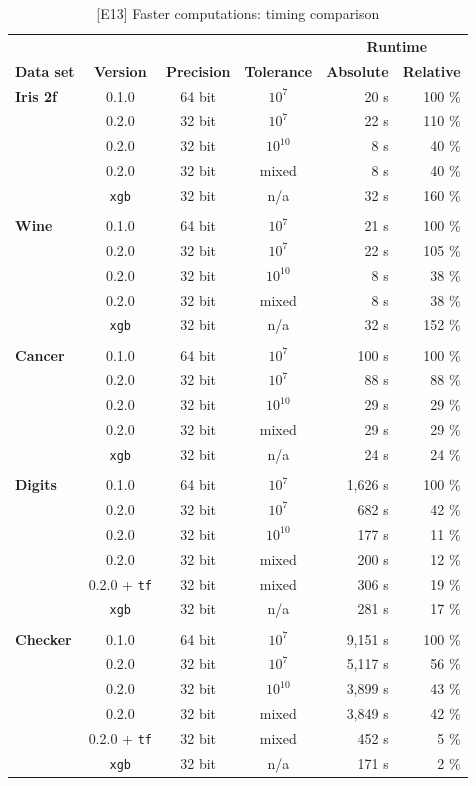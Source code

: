 \begin{table}
\caption{[E13] Faster computations: timing comparison}
\label{tab_faster_timing}
%
\begin{center}
\small
\begin{tabular}{|lcccrr|}
\hline
&&&&\multicolumn{2}{c|}{\hrulefill\ \textbf{Runtime} \hrulefill}\\
\textbf{Data set}&\textbf{Version}&\textbf{Precision}&\textbf{Tolerance}&\textbf{Absolute}&\textbf{Relative}\\
\textbf{Iris 2f}&0.1.0&64 bit&$10^7$&20 s&100 \%\\
&0.2.0&32 bit&$10^7$&22 s&110 \%\\
&0.2.0&32 bit&$10^{10}$&8 s&40 \%\\
&0.2.0&32 bit&mixed&8 s&40 \%\\
&\texttt{xgb}&32 bit&n/a&32 s&160 \%\\
&&&&&\\
\textbf{Wine}&0.1.0&64 bit&$10^7$&21 s&100 \%\\
&0.2.0&32 bit&$10^7$&22 s&105 \%\\
&0.2.0&32 bit&$10^{10}$&8 s&38 \%\\
&0.2.0&32 bit&mixed&8 s&38 \%\\
&\texttt{xgb}&32 bit&n/a&32 s&152 \%\\
&&&&&\\
\textbf{Cancer}&0.1.0&64 bit&$10^7$&100 s&100 \%\\
&0.2.0&32 bit&$10^7$&88 s&88 \%\\
&0.2.0&32 bit&$10^{10}$&29 s&29 \%\\
&0.2.0&32 bit&mixed&29 s&29 \%\\
&\texttt{xgb}&32 bit&n/a&24 s&24 \%\\
&&&&&\\
\textbf{Digits}&0.1.0&64 bit&$10^7$&1,626 s&100 \%\\
&0.2.0&32 bit&$10^7$&682 s&42 \%\\
&0.2.0&32 bit&$10^{10}$&177 s&11 \%\\
&0.2.0&32 bit&mixed&200 s&12 \%\\
&0.2.0 + \texttt{tf}&32 bit&mixed&306 s&19 \%\\
&\texttt{xgb}&32 bit&n/a&281 s&17 \%\\
&&&&&\\
\textbf{Checker}&0.1.0&64 bit&$10^7$&9,151 s&100 \%\\
&0.2.0&32 bit&$10^7$&5,117 s&56 \%\\
&0.2.0&32 bit&$10^{10}$&3,899 s&43 \%\\
&0.2.0&32 bit&mixed&3,849 s&42 \%\\
&0.2.0 + \texttt{tf}&32 bit&mixed&452 s&5 \%\\
&\texttt{xgb}&32 bit&n/a&171 s&2 \%\\
\hline
\end{tabular}
\end{center}
\end{table}
